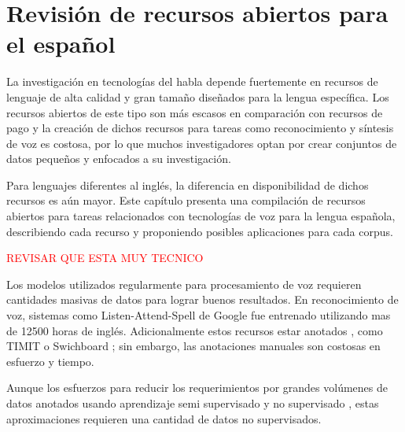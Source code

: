 

\chapter{Revisión de recursos abiertos para el español}

La investigación en tecnologías del habla depende fuertemente en recursos de lenguaje de alta calidad y gran tamaño diseñados para la lengua específica. Los recursos abiertos de este tipo son más escasos en comparación con recursos de pago y la creación de dichos recursos para tareas como reconocimiento y síntesis de voz es costosa, por lo que muchos investigadores optan por crear conjuntos de datos pequeños y enfocados a su investigación.

Para lenguajes diferentes al inglés, la diferencia en disponibilidad de dichos recursos es aún mayor. Este capítulo presenta una compilación de recursos abiertos para tareas relacionados con tecnologías de voz para la lengua española, describiendo cada recurso y proponiendo posibles aplicaciones para cada corpus. 


\textcolor{red}{REVISAR QUE ESTA MUY TECNICO}

Los modelos utilizados regularmente para procesamiento de voz requieren cantidades masivas de datos para lograr buenos resultados. En reconocimiento de voz, sistemas como Listen-Attend-Spell de Google \cite{Chiu2018} fue entrenado utilizando mas de 12500 horas de inglés. Adicionalmente estos recursos  estar anotados , como TIMIT \cite{TIMIT} o Swichboard \cite{Switchboard}; sin embargo, las anotaciones manuales son costosas en esfuerzo y tiempo.

Aunque los esfuerzos para reducir los requerimientos por grandes volúmenes de datos anotados usando aprendizaje semi supervisado \cite{AmazonSemiSupervised} y no supervisado \cite{ZeroResources}, estas aproximaciones requieren una  cantidad  de datos no supervisados.

